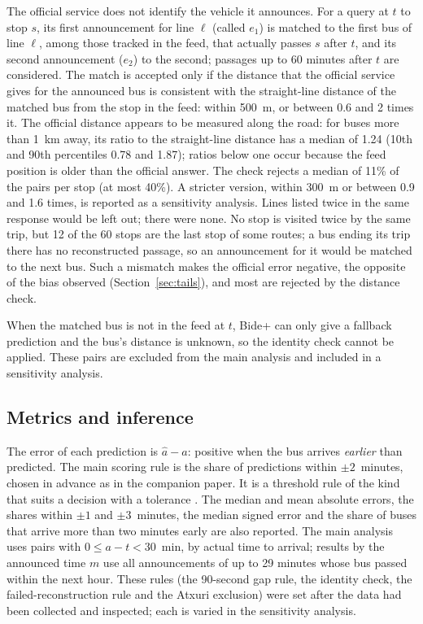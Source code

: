 The official service does not identify the vehicle it announces. For a query at $t$ to stop $s$, its first announcement for
line $\ell$ (called $e_1$) is matched to the first bus of line $\ell$, among those tracked in the feed, that actually passes
$s$ after $t$, and its second announcement ($e_2$) to the second; passages up to 60 minutes after $t$ are considered. The
match is accepted only if the distance that the official service gives for the announced bus is consistent with the
straight-line distance of the matched bus from the stop in the feed: within 500~m, or between 0.6 and 2 times it. The
official distance appears to be measured along the road: for buses more than 1~km away, its ratio to the straight-line
distance has a median of 1.24 (10th and 90th percentiles 0.78 and 1.87); ratios below one occur because the feed
position is older than the official answer. The check rejects a median of 11\% of the pairs per stop (at most 40\%). A stricter version, within 300~m or between 0.9 and 1.6 times, is reported as a sensitivity
analysis. Lines listed twice in the same response would be left out; there were none. No stop is visited twice by the same trip,
but 12 of the 60 stops are the last stop of some routes; a bus ending its trip there has no reconstructed passage, so an
announcement for it would be matched to the next bus. Such a mismatch makes the official error negative, the opposite of
the bias observed (Section~\ref{sec:tails}), and most are rejected by the distance check.

When the matched bus is not in the feed at $t$, Bide+ can only give a fallback prediction and the bus's distance is
unknown, so the identity check cannot be applied. These pairs are excluded from the main analysis and included in a
sensitivity analysis.

\subsection{Metrics and inference}

The error of each prediction is $\hat a - a$: positive when the bus arrives \emph{earlier} than predicted. The main scoring
rule is the share of predictions within $\pm2$~minutes, chosen in advance as in the companion paper. It is a threshold
rule of the kind that suits a decision with a tolerance \parencite{gneiting2011point}. The median and mean absolute errors,
the shares within $\pm1$ and $\pm3$~minutes, the median signed error and the share of buses that arrive more than two
minutes early are also reported. The main analysis uses pairs with $0 \le a - t < 30$~min, by actual time to arrival;
results by the announced time $m$ use all announcements of up to 29 minutes whose bus passed within the next hour.
These rules (the 90-second gap rule, the identity check, the failed-reconstruction rule and the Atxuri exclusion) were
set after the data had been collected and inspected; each is varied in the sensitivity analysis.

